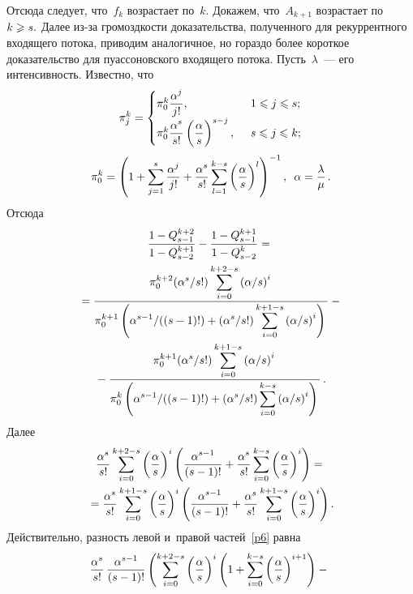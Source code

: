 \begin{multicols}{2}
{Отсюда следует, что~$f_k$ возрастает по~$k.$ Докажем, 
что~$A_{k+1}$ возрастает по $k\hm\geqslant s.$ Далее из-за громоздкости
доказательства, полученного для рекуррентного входящего потока,
приводим аналогичное, но гораздо более короткое доказательство для
пуассоновского входящего потока. Пусть~$\lambda$~--- его
интенсивность. Известно, что
\begin{equation*}
\pi_j^k=
\begin{cases}
\pi_0^k \displaystyle\frac{\displaystyle \alpha^j\mathstrut}{\displaystyle j!\mathstrut}, &\enskip 1\leqslant j\leqslant s;\\
\pi_0^k\displaystyle\frac{\displaystyle \alpha^s\mathstrut}{\displaystyle s!\mathstrut}\left(\displaystyle\frac{\displaystyle \alpha\mathstrut}{\displaystyle s\mathstrut}\right)^{s-j},&\enskip
s\leqslant j\leqslant k;
\end{cases}
\end{equation*}
\begin{equation*}
\pi_0^k=\left(1+\sum\limits_{j=1}^s \displaystyle\frac{\displaystyle \alpha^j\mathstrut}{\displaystyle j!\mathstrut}+
\displaystyle\frac{\displaystyle \alpha^s\mathstrut}{\displaystyle s!\mathstrut} \sum\limits_{l=1}^{k-s}\left(\displaystyle\frac{\displaystyle \alpha\mathstrut}{\displaystyle s\mathstrut}\right)^{l}\right)^{-1},\enskip
\alpha=\displaystyle\frac{\displaystyle \lambda\mathstrut}{\displaystyle \mu\mathstrut}\,.
\end{equation*}
Отсюда
\begin{multline}
\fr{1-Q_{s-1}^{k+2}}{1-Q_{s-2}^{k+1}}-
\fr{1-Q_{s-1}^{k+1}}{1-Q_{s-2}^{k}}={}\\
{}=
\fr{\pi_0^{k+2}({\alpha^s}/{s!})
\sum\limits_{i=0}^{k+2-s}\left({\alpha}/{s}\right)^i}
{\pi_0^{k+1}\left({\alpha^{s-1}}/({(s-1)!})+({\alpha^s}/{s!})
\sum\limits_{i=0}^{k+1-s}
\left({\alpha}/{s}\right)^i\right)}-{}\\
{}-
\fr{\pi_0^{k+1}({\alpha^s}/{s!})
\sum\limits_{i=0}^{k+1-s}\left({\alpha}/{s}\right)^i}
{\pi_0^{k}\left({\alpha^{s-1}}/({(s-1)!})+({\alpha^s}/{s!})\sum\limits_{i=0}^{k-s}
\left({\alpha}/{s}\right)^i\right)}\,.
\label{p5}
\end{multline}
Далее
\begin{multline}
\fr{\alpha^s}{s!}\sum\limits_{i=0}^{k+2-s}\left(\fr{\alpha}{s}\right)^i
\left(\fr{\alpha^{s-1}}{(s-1)!}+\fr{\alpha^s}{s!}\sum\limits_{i=0}^{k-s}
\left(\fr{\alpha}{s}\right)^i\right)={}\\
{}=\fr{\alpha^s}{s!}\sum\limits_{i=0}^{k+1-s}\left(\fr{\alpha}{s}\right)^i
\left(\fr{\alpha^{s-1}}{(s-1)!}+\dfrac{\alpha^s}{s!}\sum\limits_{i=0}^{k+1-s}
\left(\fr{\alpha}{s}\right)^i\right).
\label{p6}
\end{multline}
Действительно, разность левой и~правой частей~\eqref{p6} равна
\begin{multline*}
\fr{\alpha^s}{s!}\,\fr{\alpha^{s-1}}{(s-1)!}\left(\sum\limits_{i=0}^{k+2-s}
\left(\fr{\alpha}{s}\right)^i\left(1+\sum\limits_{i=0}^{k-s}
\left(\fr{\alpha}{s}\right)^{i+1}\right)-{}\right.\\

\end{multline*}}
\end{multicols}
